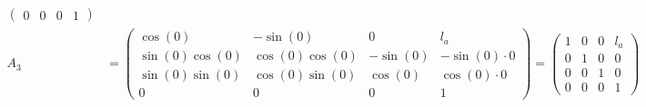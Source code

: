 \documentclass[a4paper,11pt]{article}
\begin{document}
\begin {enumerate}
\begin{enumerate}
\begin{align*}
\begin{pmatrix}
              0 & 0 & 0 & 1
            \end{pmatrix}\\
          A_3 &=
            \begin{pmatrix}
              \cos(0) & -\sin(0) & 0 & l_a\\
              \sin(0)\cos(0) & \cos(0)\cos(0) & -\sin(0) & -\sin(0) \cdot 0\\
              \sin(0)\sin(0) & \cos(0)\sin(0) & \cos(0) & \cos(0) \cdot 0\\
              0 & 0 & 0 & 1
            \end{pmatrix} = \begin{pmatrix}
              1 & 0 & 0 & l_a\\
              0 & 1 & 0 & 0\\
              0 & 0 & 1 & 0\\
              0 & 0 & 0 & 1
            \end{pmatrix}\\
        \end{align*}


\end{enumerate}
\end{enumerate}
\end{document}
